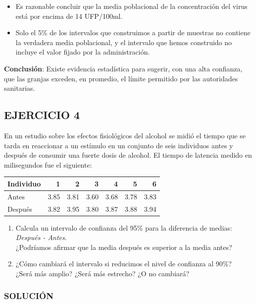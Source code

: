 \documentclass[
]{article}
\providecommand{\tightlist}{%
  \setlength{\itemsep}{0pt}\setlength{\parskip}{0pt}}
\begin{document}
\begin{itemize}
\tightlist
\item
  Es razonable concluir que la media poblacional de la concentración del virus está por encima de 14 UFP/100ml.
\item
  Solo el 5\% de los intervalos que construimos a partir de muestras no contiene la verdadera media poblacional, y el intervalo que hemos construido no incluye el valor fijado por la administración.
\end{itemize}

\textbf{Conclusión}: Existe evidencia estadística para sugerir, con una alta confianza, que las granjas exceden, en promedio, el límite permitido por las autoridades sanitarias.

\subsection{EJERCICIO 4}\label{ejercicio-4-2}

En un estudio sobre los efectos fisiológicos del alcohol se midió el tiempo que se tarda en reaccionar a un estímulo en un conjunto de seis individuos antes y después de consumir una fuerte dosis de alcohol. El tiempo de latencia medido en milisegundos fue el siguiente:

\begin{longtable}[]{@{}lrrrrrr@{}}
\toprule\noalign{}
Individuo & 1 & 2 & 3 & 4 & 5 & 6 \\
\midrule\noalign{}
\endhead
\bottomrule\noalign{}
\endlastfoot
Antes & 3.85 & 3.81 & 3.60 & 3.68 & 3.78 & 3.83 \\
Después & 3.82 & 3.95 & 3.80 & 3.87 & 3.88 & 3.94 \\
\end{longtable}

\begin{enumerate}
\def\labelenumi{\alph{enumi})}
\item
  Calcula un intervalo de confianza del 95\% para la diferencia de medias: \emph{Después - Antes}.\\
  ¿Podríamos afirmar que la media después es superior a la media antes?
\item
  ¿Cómo cambiará el intervalo si reducimos el nivel de confianza al 90\%?\\
  ¿Será más amplio? ¿Será más estrecho? ¿O no cambiará?
\end{enumerate}

\subsubsection{SOLUCIÓN}\label{soluciuxf3n-18}
\end{document}
